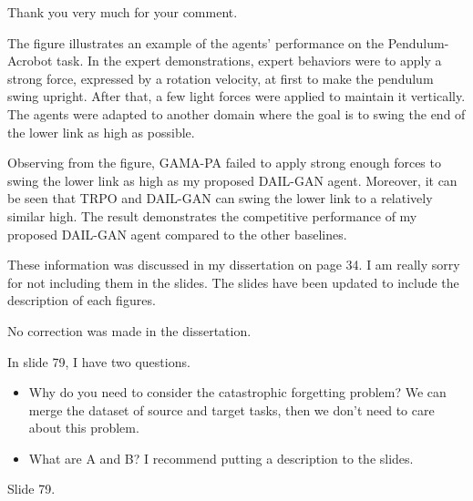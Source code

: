 \begin{revresponse}
  Thank you very much for your comment.

  The figure illustrates an example of the agents' performance on the Pendulum-Acrobot task.
  In the expert demonstrations,
  expert behaviors were to apply a strong force,
  expressed by a rotation velocity,
  at first to make the pendulum swing upright.
  After that,
  a few light forces were applied to maintain it vertically.
  The agents were adapted to another domain where the goal is to swing the end of the lower link as high as possible.

  Observing from the figure,
  GAMA-PA failed to apply strong enough forces to swing the lower link as high as my proposed DAIL-GAN agent.
  Moreover, it can be seen that TRPO and DAIL-GAN can swing the lower link to a relatively similar high.
  The result demonstrates the competitive performance of my proposed DAIL-GAN agent compared to the other baselines.

  These information was discussed in my dissertation on page 34.
  I am really sorry for not including them in the slides.
  The slides have been updated to include the description of each figures.

  \begin{correction}
    No correction was made in the dissertation.
  \end{correction}
\end{revresponse}


\begin{revcomment}
  In slide 79, I have two questions.

  \begin{itemize}
    \item Why do you need to consider the catastrophic forgetting problem?
          We can merge the dataset of source and target tasks, then we don't need to care about this problem.

    \item What are A and B? I recommend putting a description to the slides.
  \end{itemize}

  {Slide 79.}
\end{revcomment}

